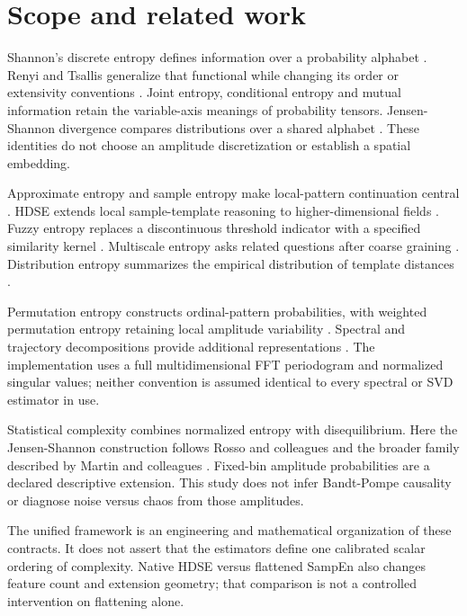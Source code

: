 \documentclass[
  english,
  11pt,
]{article}
\begin{document}
\section{Scope and related work}\label{sec:scope}

Shannon's discrete entropy defines information over a probability
alphabet \citep{shannon1948}. Renyi and Tsallis generalize that
functional while changing its order or extensivity conventions
\citep{renyi1961, tsallis1988}. Joint entropy, conditional entropy and
mutual information retain the variable-axis meanings of probability
tensors. Jensen-Shannon divergence compares distributions over a shared
alphabet \citep{lin1991}. These identities do not choose an amplitude
discretization or establish a spatial embedding.

Approximate entropy and sample entropy make local-pattern continuation
central \citep{pincus1991, richman2000}. HDSE extends local
sample-template reasoning to higher-dimensional fields
\citep{xia2026hdse}. Fuzzy entropy replaces a discontinuous threshold
indicator with a specified similarity kernel \citep{chen2007}.
Multiscale entropy asks related questions after coarse graining
\citep{costa2002}. Distribution entropy summarizes the empirical
distribution of template distances \citep{li2015distribution}.

Permutation entropy constructs ordinal-pattern probabilities, with
weighted permutation entropy retaining local amplitude variability
\citep{bandt2002, fadlallah2013}. Spectral and trajectory decompositions
provide additional representations \citep{rezek1998, broomhead1986}. The
implementation uses a full multidimensional FFT periodogram and
normalized singular values; neither convention is assumed identical to
every spectral or SVD estimator in use.

Statistical complexity combines normalized entropy with disequilibrium.
Here the Jensen-Shannon construction follows Rosso and colleagues and
the broader family described by Martin and colleagues
\citep{rosso2007, martin2006}. Fixed-bin amplitude probabilities are a
declared descriptive extension. This study does not infer Bandt-Pompe
causality or diagnose noise versus chaos from those amplitudes.

The unified framework is an engineering and mathematical organization of
these contracts. It does not assert that the estimators define one
calibrated scalar ordering of complexity. Native HDSE versus flattened
SampEn also changes feature count and extension geometry; that
comparison is not a controlled intervention on flattening alone.
\end{document}
